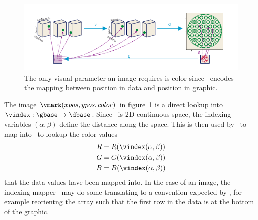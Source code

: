 \documentclass[../main.tex]{subfiles}
\begin{document}
\begin{figure}[H]
    \includegraphics[width=\textwidth]{figures/math/image.png}
    \caption{The only visual parameter an image requires is color since \vindex\ encodes the mapping between position in data and position in graphic. }
    \label{fig:artist_heatmap}
\end{figure}

The image $\vmark(xpos, ypos, color)$ in figure~\ref{fig:artist_heatmap} is a direct lookup into  $\vindex:\gbase\rightarrow\dbase$. Since \dbase\ is 2D continuous space, the indexing variables $(\alpha, \beta)$ define the distance along the space. This is then used by \vindex\ to map into \dbase\ to lookup the color values 
\begin{align}
R &= R(\vindex(\alpha, \beta))\\
G &= G(\vindex(\alpha, \beta))\\
B &= B(\vindex(\alpha, \beta))
\end{align}
that the data values have been mapped into. In the case of an image, the indexing mapper \vindex\ may do some translating to a convention expected by \vmark, for example reorientng the array such that the first row in the data is at the bottom of the graphic. 
\end{document}
